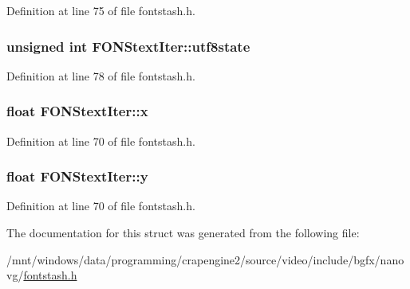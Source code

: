 Definition at line 75 of file fontstash.\+h.

\hypertarget{struct_f_o_n_stext_iter_a325cc1ced940302cd1685adc6781de19}{
\subsubsection[{utf8state}]{\setlength{\rightskip}{0pt plus 5cm}unsigned int F\+O\+N\+Stext\+Iter\+::utf8state}}\label{struct_f_o_n_stext_iter_a325cc1ced940302cd1685adc6781de19}


Definition at line 78 of file fontstash.\+h.

\hypertarget{struct_f_o_n_stext_iter_a84dee1d692f8d5a0b276a4b3c14305ca}{
\subsubsection[{x}]{\setlength{\rightskip}{0pt plus 5cm}float F\+O\+N\+Stext\+Iter\+::x}}\label{struct_f_o_n_stext_iter_a84dee1d692f8d5a0b276a4b3c14305ca}


Definition at line 70 of file fontstash.\+h.

\hypertarget{struct_f_o_n_stext_iter_a67aabad5be6a2e582f855d3fc985e482}{
\subsubsection[{y}]{\setlength{\rightskip}{0pt plus 5cm}float F\+O\+N\+Stext\+Iter\+::y}}\label{struct_f_o_n_stext_iter_a67aabad5be6a2e582f855d3fc985e482}


Definition at line 70 of file fontstash.\+h.



The documentation for this struct was generated from the following file\+:\begin{DoxyCompactItemize}
\item 
/mnt/windows/data/programming/crapengine2/source/video/include/bgfx/nanovg/\hyperlink{fontstash_8h}{fontstash.\+h}\end{DoxyCompactItemize}
